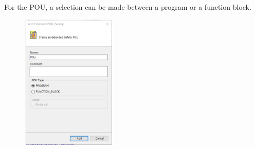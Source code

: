 \documentclass[a4paper,12pt]{article}
\begin{document}
For the POU, a selection can be made between a program or a function block.

\begin{figure}[H]
	\centering
	\includegraphics[width=0.4\textwidth]{e2.JPG}
\end{figure}
\end{document}
